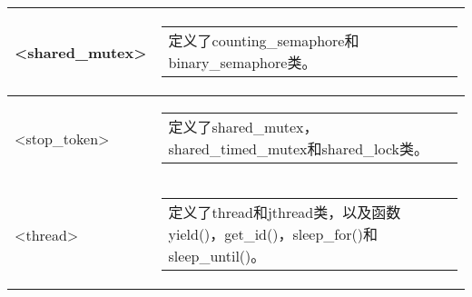 \begin{longtable}{|l|l|}
\textless{}shared\_mutex\textgreater{}       & \begin{tabular}[c]{@{}l@{}}定义了counting\_semaphore和binary\_semaphore类。\end{tabular} \\ \hline
\textless{}stop\_token\textgreater{}         & \begin{tabular}[c]{@{}l@{}}定义了shared\_mutex，shared\_timed\_mutex和shared\_lock类。\end{tabular}          \\ \hline
\textless{}thread\textgreater{} &
\begin{tabular}[c]{@{}l@{}}定义了thread和jthread类，以及函数yield()，get\_id()，sleep\_for()和sleep\_until()。\end{tabular} \\ \hline
\end{longtable}
